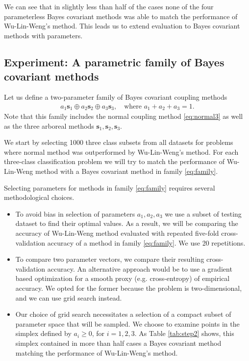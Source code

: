 

We can see that in slightly less than half of the cases none of the four parameterless Bayes covariant methods was able to match the performance of Wu-Lin-Weng's method. This leads us to extend evaluation to Bayes covariant methods with parameters. 

\subsection{Experiment: A parametric family of Bayes covariant methods}
\label{sec:exp3}

Let us define a two-parameter family of Bayes covariant coupling methods
\begin{align}
a_1 \boldsymbol{s}_1 \oplus a_2 \boldsymbol{s}_2 \oplus a_3 \boldsymbol{s}_3,\quad\textrm{where } a_1 + a_2 +a_3 = 1. \label{eq:family}
\end{align}
Note that this family includes the normal coupling method \eqref{eq:normal3} as well as the three arboreal methods $\boldsymbol{s}_1, \boldsymbol{s}_2, \boldsymbol{s}_3$.

We start by selecting 1000 three class subsets from all datasets for problems where normal method was outperformed by Wu-Lin-Weng's method. For each three-class classification problem we will try to match the performance of Wu-Lin-Weng method with a Bayes covariant method in family \eqref{eq:family}.

Selecting parameters for methods in family \eqref{eq:family} requires several methodological choices. 
\begin{itemize}
\item To avoid bias in selection of parameters $a_1, a_2, a_3$ we use a subset of testing dataset to find their optimal values. As a result, we will be comparing the accuracy of Wu-Lin-Weng method evaluated with repeated five-fold cross-validation accuracy of a method in family \eqref{eq:family}. We use 20 repetitions.
\item To compare two parameter vectors, we compare their resulting cross-validation accuracy. An alternative approach would be to use  a gradient based optimization for a smooth proxy (e.g. cross-entropy) of empirical accuracy. We opted for the former because the problem is two-dimensional, and we can use grid search instead.
\item Our choice of grid search necessitates a selection of a compact subset of parameter space that will be sampled. We choose to examine points in the simplex defined by  $a_i\geq 0$, for $i=1,2,3$. As Table \ref{tab:step2} shows, this simplex contained in more than half cases a Bayes covariant method matching the performance of Wu-Lin-Weng's method.
\end{itemize}


